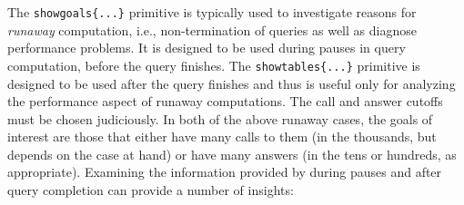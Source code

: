   The \texttt{showgoals\{...\}} primitive is typically used to investigate
  reasons for \emph{runaway} computation, i.e., non-termination of queries
  as well as diagnose performance problems. It is designed to be used
  during pauses in query computation, before the query finishes. The
  \texttt{showtables\{...\}} primitive is designed to be used after the
  query finishes and thus is useful only for analyzing the performance
  aspect of runaway computations. The call and answer cutoffs must be
  chosen judiciously.
  In both of the
  above runaway cases, the goals of interest are those that either have
  many calls to them (in the thousands, but depends on the case at hand) or
  have many answers (in the tens or hundreds, as appropriate).  Examining
  the information provided by \ERGO during pauses and after query
  completion can provide a number of insights:
